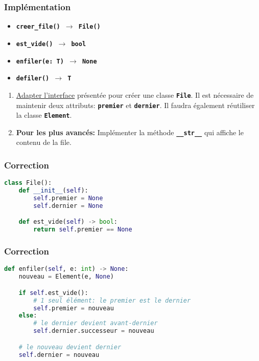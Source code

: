\documentclass[svgnames,11pt]{beamer}
\begin{document}
\begin{frame}
    \frametitle{Implémentation}

    \begin{itemize}
        \item \texttt{\textbf{creer\_file() $\rightarrow$ File()}}
        \item \texttt{\textbf{est\_vide() $\rightarrow$ bool}}
        \item \texttt{\textbf{enfiler(e: T) $\rightarrow$ None}}
        \item \texttt{\textbf{defiler() $\rightarrow$ T}}
        \end{itemize}

        \begin{activite}
            \begin{enumerate}
                \item \underline{Adapter l'interface} présentée pour créer une classe \textbf{\texttt{File}}. Il est nécessaire de maintenir deux attributs: \textbf{\texttt{premier}} et \textbf{\texttt{dernier}}. Il faudra également réutiliser la classe \textbf{\texttt{Element}}.
                \item \textbf{Pour les plus avancés:} Implémenter la méthode \textbf{\texttt{\_\_str\_\_}} qui affiche le contenu de la file.
            \end{enumerate}
        \end{activite}
\end{frame}
\begin{frame}[fragile]
    \frametitle{Correction}

\begin{lstlisting}[language=Python , basicstyle=\ttfamily\small, xleftmargin=2em, xrightmargin=2em]
class File():
    def __init__(self):
        self.premier = None
        self.dernier = None

    def est_vide(self) -> bool:
        return self.premier == None
\end{lstlisting}

\end{frame}
\begin{frame}[fragile]
    \frametitle{Correction}

\begin{lstlisting}[language=Python , basicstyle=\ttfamily\small, xleftmargin=2em, xrightmargin=2em]
def enfiler(self, e: int) -> None:
    nouveau = Element(e, None)

    if self.est_vide():
        # 1 seul élément: le premier est le dernier
        self.premier = nouveau
    else:
        # le dernier devient avant-dernier
        self.dernier.successeur = nouveau

    # le nouveau devient dernier
    self.dernier = nouveau
\end{lstlisting}

\end{frame}
\end{document}
